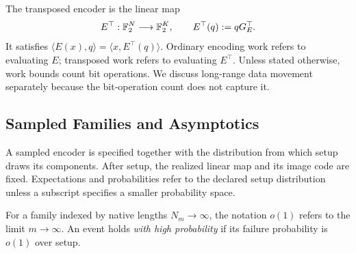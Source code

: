 The transposed encoder is the linear map
\[
  E^\top:\mathbb F_2^N\longrightarrow\mathbb F_2^K,
  \qquad
  E^\top(q):=qG_E^\top.
\]
It satisfies $\langle E(x),q\rangle=\langle x,E^\top(q)\rangle$. Ordinary
encoding work refers to evaluating $E$; transposed work refers to evaluating
$E^\top$. Unless stated otherwise, work bounds count bit operations. We discuss
long-range data movement separately because the bit-operation count does not
capture it.

\subsection{Sampled Families and Asymptotics}

A sampled encoder is specified together with the distribution from which
setup draws its components. After setup, the realized
linear map and its image code are fixed. Expectations and probabilities refer
to the declared setup distribution unless a subscript specifies a smaller
probability space.

For a family indexed by native lengths $N_m\to\infty$, the notation $o(1)$
refers to the limit $m\to\infty$. An event holds \emph{with high probability}
if its failure probability is $o(1)$ over setup.
